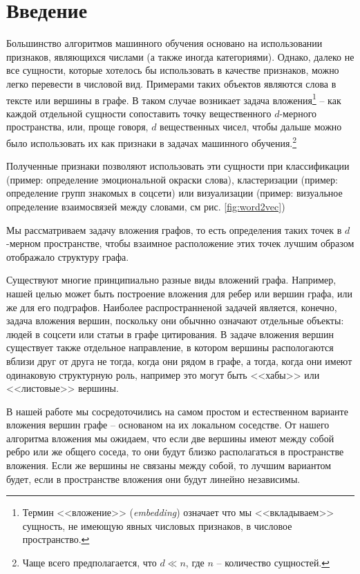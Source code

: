 \documentclass[12pt,a4paper]{extarticle}
\begin{document}
    \setcounter{page}{2}

    \tableofcontents

    \newpage

    \section{Введение}
    Большинство алгоритмов машинного обучения основано на использовании
    признаков, являющихся числами (а также иногда категориями).
    Однако, далеко не все сущности, которые хотелось бы использовать в качестве признаков,
    можно легко перевести в числовой вид.
    Примерами таких объектов являются слова в тексте или вершины в графе.
    В таком случае возникает задача вложения\footnote{Термин <<вложение>> (\textit{embedding}) означает что мы <<вкладываем>> сущность, не имеющую явных числовых признаков, в числовое пространство.} -- как каждой отдельной сущности сопоставить точку вещественного $d$-мерного пространства,
    или, проще говоря, $d$ вещественных чисел, чтобы дальше можно было использовать их как признаки в задачах машинного обучения.\footnote{Чаще всего предполагается, что $d \ll n$, где $n$ -- количество сущностей.}
    
    Полученные признаки позволяют использовать эти сущности при классификации (пример: определение эмоциональной окраски слова), кластеризации (пример: определение групп знакомых в соцсети) или визуализации (пример: визуальное определение взаимосвязей между словами, см рис. \ref{fig:word2vec})
    
    Мы рассматриваем задачу вложения графов, то есть определения таких точек в $d$-мерном пространстве, чтобы взаимное расположение этих точек лучшим образом отображало структуру графа.
    
    Существуют многие принципиально разные виды вложений графа.
    Например, нашей целью может быть построение вложения для ребер или вершин графа, или же для его подграфов.
    Наиболее распространненой задачей является, конечно, задача вложения вершин, поскольку они обычнно означают отдельные объекты: людей в соцсети или статьи в графе цитирования.
    В задаче вложения вершин существует также отдельное направление, в котором вершины распологаются вблизи друг от друга не тогда, когда они рядом в графе, а тогда, когда они имеют одинаковую структурную роль, например это могут быть <<хабы>> или <<листовые>> вершины.
    
    В нашей работе мы сосредоточились на самом простом и естественном варианте вложения вершин графе -- основаном на их локальном соседстве.
    От нашего алгоритма вложения мы ожидаем, что если две вершины имеют между собой ребро или же общего соседа, то они будут близко располагаться в пространстве вложения.
    Если же вершины не связаны между собой, то лучшим вариантом будет, если в пространстве вложения они будут линейно независимы.
    
\end{document}
